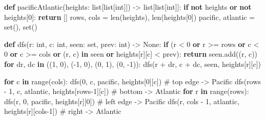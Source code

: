 \documentclass[11pt]{article}
\newenvironment{Shaded}{\begin{snugshade}}{\end{snugshade}}
\newcommand{\BuiltInTok}[1]{\textcolor[rgb]{0.50,0.55,0.55}{#1}}
\newcommand{\CommentTok}[1]{\textcolor[rgb]{0.48,0.49,0.49}{#1}}
\newcommand{\ControlFlowTok}[1]{\textcolor[rgb]{0.99,0.74,0.29}{\textbf{#1}}}
\newcommand{\DecValTok}[1]{\textcolor[rgb]{0.96,0.45,0.00}{#1}}
\newcommand{\KeywordTok}[1]{\textcolor[rgb]{0.81,0.81,0.76}{\textbf{#1}}}
\newcommand{\NormalTok}[1]{\textcolor[rgb]{0.81,0.81,0.76}{#1}}
\newcommand{\OperatorTok}[1]{\textcolor[rgb]{0.81,0.81,0.76}{#1}}
\newcommand{\VariableTok}[1]{\textcolor[rgb]{0.15,0.68,0.68}{#1}}
\begin{document}
\begin{Shaded}
\begin{Highlighting}[]
\KeywordTok{def}\NormalTok{ pacificAtlantic(heights: }\BuiltInTok{list}\NormalTok{[}\BuiltInTok{list}\NormalTok{[}\BuiltInTok{int}\NormalTok{]]) }\OperatorTok{{-}\textgreater{}} \BuiltInTok{list}\NormalTok{[}\BuiltInTok{list}\NormalTok{[}\BuiltInTok{int}\NormalTok{]]:}
    \ControlFlowTok{if} \KeywordTok{not}\NormalTok{ heights }\KeywordTok{or} \KeywordTok{not}\NormalTok{ heights[}\DecValTok{0}\NormalTok{]:}
        \ControlFlowTok{return}\NormalTok{ []}
\NormalTok{    rows, cols }\OperatorTok{=} \BuiltInTok{len}\NormalTok{(heights), }\BuiltInTok{len}\NormalTok{(heights[}\DecValTok{0}\NormalTok{])}
\NormalTok{    pacific, atlantic }\OperatorTok{=} \BuiltInTok{set}\NormalTok{(), }\BuiltInTok{set}\NormalTok{()}

    \KeywordTok{def}\NormalTok{ dfs(r: }\BuiltInTok{int}\NormalTok{, c: }\BuiltInTok{int}\NormalTok{, seen: }\BuiltInTok{set}\NormalTok{, prev: }\BuiltInTok{int}\NormalTok{) }\OperatorTok{{-}\textgreater{}} \VariableTok{None}\NormalTok{:}
        \ControlFlowTok{if}\NormalTok{ (r }\OperatorTok{\textless{}} \DecValTok{0} \KeywordTok{or}\NormalTok{ r }\OperatorTok{\textgreater{}=}\NormalTok{ rows }\KeywordTok{or}\NormalTok{ c }\OperatorTok{\textless{}} \DecValTok{0} \KeywordTok{or}\NormalTok{ c }\OperatorTok{\textgreater{}=}\NormalTok{ cols}
                \KeywordTok{or}\NormalTok{ (r, c) }\KeywordTok{in}\NormalTok{ seen }\KeywordTok{or}\NormalTok{ heights[r][c] }\OperatorTok{\textless{}}\NormalTok{ prev):}
            \ControlFlowTok{return}
\NormalTok{        seen.add((r, c))}
        \ControlFlowTok{for}\NormalTok{ dr, dc }\KeywordTok{in}\NormalTok{ ((}\DecValTok{1}\NormalTok{, }\DecValTok{0}\NormalTok{), (}\OperatorTok{{-}}\DecValTok{1}\NormalTok{, }\DecValTok{0}\NormalTok{), (}\DecValTok{0}\NormalTok{, }\DecValTok{1}\NormalTok{), (}\DecValTok{0}\NormalTok{, }\OperatorTok{{-}}\DecValTok{1}\NormalTok{)):}
\NormalTok{            dfs(r }\OperatorTok{+}\NormalTok{ dr, c }\OperatorTok{+}\NormalTok{ dc, seen, heights[r][c])}

    \ControlFlowTok{for}\NormalTok{ c }\KeywordTok{in} \BuiltInTok{range}\NormalTok{(cols):}
\NormalTok{        dfs(}\DecValTok{0}\NormalTok{, c, pacific, heights[}\DecValTok{0}\NormalTok{][c])           }\CommentTok{\# top edge {-}\textgreater{} Pacific}
\NormalTok{        dfs(rows }\OperatorTok{{-}} \DecValTok{1}\NormalTok{, c, atlantic, heights[rows}\OperatorTok{{-}}\DecValTok{1}\NormalTok{][c])  }\CommentTok{\# bottom {-}\textgreater{} Atlantic}
    \ControlFlowTok{for}\NormalTok{ r }\KeywordTok{in} \BuiltInTok{range}\NormalTok{(rows):}
\NormalTok{        dfs(r, }\DecValTok{0}\NormalTok{, pacific, heights[r][}\DecValTok{0}\NormalTok{])           }\CommentTok{\# left edge {-}\textgreater{} Pacific}
\NormalTok{        dfs(r, cols }\OperatorTok{{-}} \DecValTok{1}\NormalTok{, atlantic, heights[r][cols}\OperatorTok{{-}}\DecValTok{1}\NormalTok{])  }\CommentTok{\# right {-}\textgreater{} Atlantic}


\end{Highlighting}
\end{Shaded}
\end{document}
